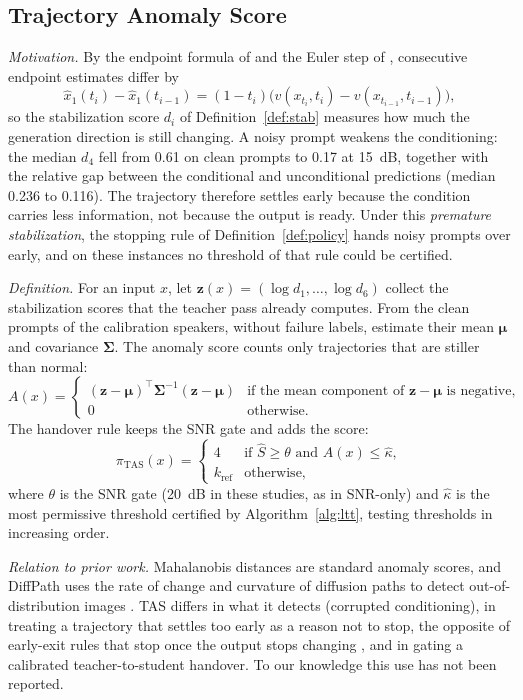 \subsection{Trajectory Anomaly Score}
\label{app:cand-tas}

\emph{Motivation.} By the endpoint formula of  and the Euler step of , consecutive endpoint estimates differ by
\[
\hat x_1(t_i)-\hat x_1(t_{i-1}) = (1-t_i)\bigl(v(x_{t_i},t_i)-v(x_{t_{i-1}},t_{i-1})\bigr),
\]
so the stabilization score $d_i$ of Definition~\ref{def:stab} measures how much the generation direction is still changing. A noisy prompt weakens the conditioning: the median $d_4$ fell from 0.61 on clean prompts to 0.17 at 15~dB, together with the relative gap between the conditional and unconditional predictions (median 0.236 to 0.116). The trajectory therefore settles early because the condition carries less information, not because the output is ready. Under this \emph{premature stabilization}, the stopping rule of Definition~\ref{def:policy} hands noisy prompts over early, and on these instances no threshold of that rule could be certified.

\emph{Definition.} For an input $x$, let $\mathbf z(x)=(\log d_1,\dots,\log d_6)$ collect the stabilization scores that the teacher pass already computes. From the clean prompts of the calibration speakers, without failure labels, estimate their mean $\boldsymbol\mu$ and covariance $\boldsymbol\Sigma$. The anomaly score counts only trajectories that are stiller than normal:
\[
A(x)=\begin{cases}(\mathbf z-\boldsymbol\mu)^{\top}\boldsymbol\Sigma^{-1}(\mathbf z-\boldsymbol\mu) & \text{if the mean component of } \mathbf z-\boldsymbol\mu \text{ is negative},\\[2pt] 0 & \text{otherwise.}\end{cases}
\]
The handover rule keeps the SNR gate and adds the score:
\[
\pi_{\mathrm{TAS}}(x)=\begin{cases}4 & \text{if } \hat S\ge\theta \text{ and } A(x)\le\hat\kappa,\\[2pt] k_{\text{ref}} & \text{otherwise,}\end{cases}
\]
where $\theta$ is the SNR gate (20~dB in these studies, as in SNR-only) and $\hat\kappa$ is the most permissive threshold certified by Algorithm~\ref{alg:ltt}, testing thresholds in increasing order.

\emph{Relation to prior work.} Mahalanobis distances are standard anomaly scores, and DiffPath uses the rate of change and curvature of diffusion paths to detect out-of-distribution images \parencite{heng2024diffpath}. TAS differs in what it detects (corrupted conditioning), in treating a trajectory that settles too early as a reason not to stop, the opposite of early-exit rules that stop once the output stops changing \parencite{schuster2022calm}, and in gating a calibrated teacher-to-student handover. To our knowledge this use has not been reported.


